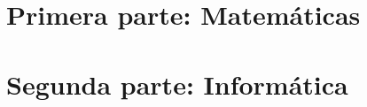 \documentclass[print, color]{ugrTFG}
\begin{document}
\maketitle

\frontmatter %

   

                    

 

 



\mainmatter %

\part{Primera parte: Matemáticas} %

% 
% 









\cleardoublepage\part{Segunda parte: Informática}
% 






\end{document}
